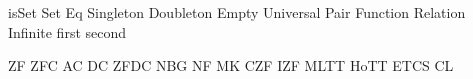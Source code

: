 \def\Llam#1#2{\lambda\,{#1}\,.\,{#2}}
\def\Lmac#1{\underline{\mathtt{#1}}}
\def\Lfinto{\rightarrow\mathrel{\kern-.8em}\rightarrow}
\def\Lnum#1{{\underline{#1}}}
\def\xstep[#1]{\mathrel{\;\triangleright_{\kern-.4em{}_{#1}\;}}}
\def\tstep[#1]{\xstep[\mathrmtiny{#1}]}
\def\lamstep{\xstep[\lambda]}
\def\juststep{\xstep[\phantom{\beta}]}
\def\alphastep{\xstep[\alpha]}
\def\betastep{\xstep[\beta]}
\def\etastep{\xstep[\eta]}
\def\calcstep{\tstep[c]}
\def\invstep{\phantom{\lamstep}}
\let\istep=\invstep
\let\jstep=\juststep
\let\lstep=\lamstep
\let\astep=\alphastep
\let\bstep=\betastep
\let\estep=\etastep
\let\cstep=\calcstep
\def\lameq{\mathrel{\,=\,}}
\def\isteq{\istep\lameq}%
\def\redex#1{\underline{#1}}

\def\C#1{{\mathord{\mathsfmbf{#1}}}}
\def\Cto{\mathrel{\triangleright}}
\def\cI{{\C I}}
\def\cK{{\C K}}
\def\cM{{\C M}}
\def\cC{{\C C}}
\def\cS{{\C S}}
\def\cW{{\C W}}
\def\cB{{\C B}}
\def\cR{{\C R}}
\def\cV{{\C V}}
\def\cBp{{{\C B}'}}

\let\knuthsetminus=\setminus
\def\setminus{\mathbin{\knuthsetminus}}
\def\cantorcard#1{\overline{\overline{#1}}}
\def\cantorset{{\frak C}}
\def\continuum{\euf{c}}
\def\finord#1{\overline{#1}}
\def\eqc{\mathrel{=_{\namedop{c}}}}
\def\neqc{\mathrel{\not\eqc}}
\def\leqc{\mathrel{\leq_{\namedop{c}}}}
\def\geqc{\mathrel{\geq_{\namedop{c}}}}
\def\gtc{\mathrel{>_{\namedop{c}}}}
\def\ltc{\mathrel{<_{\namedop{c}}}}
\def\Univ{{\bbb V}}
\def\complement#1{\widetilde{#1}}
\let\compl=\complement
\def\russell#1{{\mathbf{r}(#1)}}
\def\metain{\mathrel{\in\kern-0.425em\in}}
\let\inclass=\metain
\def\classst#1#2{\pmbb{\{}\;{#1}\;\st \;{#2}\;\pmbb{\}}}
\def\classstt#1#2{\pmbb{\{}\;{#1}\;\st \;{\text{#2}}\;\pmbb{\}}}
\def\classimg#1#2{{#1}{\pmbb[}\,{#2}\,{\pmbb]}}
\let\clsimg=\classimg
\def\universet{{\cal U}}
\DefREL isSet Set
\DefRel Eq
\DefRel Singleton
\DefRel Doubleton
\DefRel Empty
\DefRel Universal
\DefRel Pair
\DefRel Function
\DefRel Relation
\DefRel Infinite
\DefFun first
\DefFun second
\def\kurpair#1#2{\set{\set{#1}, \set{{#1}, {#2}}}}
\def\disjunion{\mathbin{\uplus}}
\def\Disjunion{\mathop{\biguplus}}
\let\dunion=\disjunion
\let\Dunion=\Disjunion
\def\setsucc#1{{#1}{}^+}
\def\kleenestar#1{{#1}^\star}
\def\kleenestarp#1{\paren{#1}^\star}
\let\kstar=\kleenestar
\let\kstarp=\kleenestarp

\DefFou ZF
\DefFou ZFC
\DefFou AC
\DefFou DC
\DefFou ZFDC
\DefFou NBG
\DefFou NF
\DefFou MK
\DefFou CZF
\DefFou IZF
\DefFou MLTT
\DefFou HoTT
\DefFou ETCS
\DefFou CL
\def\ACN{\mathord{\AC}_\nats}

